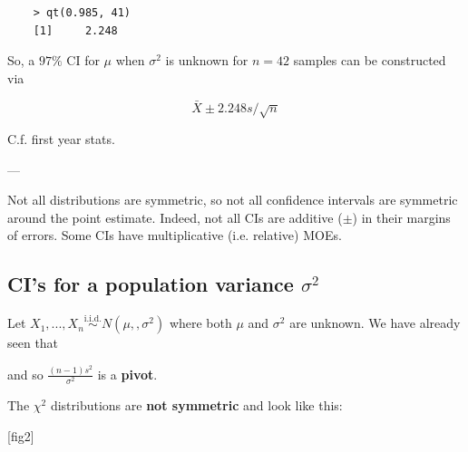 \medskip 

\begin{lstlisting}
    > qt(0.985, 41)
    [1]     2.248
\end{lstlisting}

\medskip

So, a \(97\%\) CI for \(\mu\) when \(\sigma^2\) is unknown for \(n=42\) samples can be constructed via 

\begin{equation*}
    \bar{X} \pm 2.248s/\sqrt{n}
\end{equation*}

C.f. first year stats.

---

Not all distributions are symmetric, so not all confidence intervals are symmetric around the point estimate. 
Indeed, not all CIs are additive (\(\pm\)) in their margins of errors. Some CIs have multiplicative (i.e. relative) MOEs.

\subsection{CI's for a population variance \texorpdfstring{\(\sigma^2\)}{sigma\^2}} \label{subsec:CI for sigma}

Let \(X_1,...,X_n \overset{\text{i.i.d.}}{\sim} N(\mu,,\sigma^2)\) where both \(\mu\) and \(\sigma^2\) are unknown. 
We have already seen that 

    

and so \(\frac{(n-1)s^2}{\sigma^2}\) is a \textbf{pivot}. 

The \(\chi^2\) distributions are \textbf{not symmetric} and look like this:

[fig2]